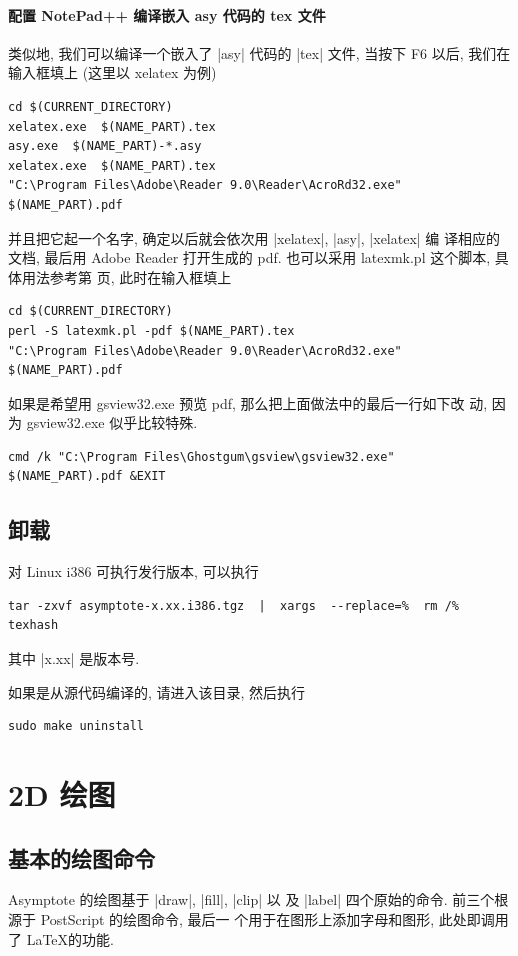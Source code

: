 \documentclass[nofonts,CJKnormalspaces]{ctexbook}[2009/05/20]
\begin{document}
\subsubsection{配置 NotePad++ 编译嵌入 asy 代码的 tex 文件}
类似地, 我们可以编译一个嵌入了 |asy| 代码的 |tex| 文件, 当按下 F6 以后,
我们在输入框填上 (这里以 xelatex 为例)
\begin{verbatim}
cd $(CURRENT_DIRECTORY)
xelatex.exe  $(NAME_PART).tex
asy.exe  $(NAME_PART)-*.asy
xelatex.exe  $(NAME_PART).tex
"C:\Program Files\Adobe\Reader 9.0\Reader\AcroRd32.exe" $(NAME_PART).pdf
\end{verbatim}
并且把它起一个名字, 确定以后就会依次用 |xelatex|, |asy|, |xelatex| 编
译相应的文档, 最后用 Adobe Reader 打开生成的 pdf.
也可以采用 latexmk.pl 这个脚本, 具体用法参考第 \pageref{asy:latexmk}
页, 此时在输入框填上
\begin{verbatim}
cd $(CURRENT_DIRECTORY)
perl -S latexmk.pl -pdf $(NAME_PART).tex
"C:\Program Files\Adobe\Reader 9.0\Reader\AcroRd32.exe" $(NAME_PART).pdf
\end{verbatim}

如果是希望用 gsview32.exe 预览 pdf, 那么把上面做法中的最后一行如下改
动, 因为 gsview32.exe 似乎比较特殊.
\begin{verbatim}
cmd /k "C:\Program Files\Ghostgum\gsview\gsview32.exe" $(NAME_PART).pdf &EXIT
\end{verbatim}

\section{卸载}
对 Linux i386 可执行发行版本, 可以执行
\begin{verbatim}
tar -zxvf asymptote-x.xx.i386.tgz  |  xargs  --replace=%  rm /%
texhash
\end{verbatim}
其中 |x.xx| 是版本号.

如果是从源代码编译的, 请进入该目录, 然后执行
\begin{verbatim}
sudo make uninstall
\end{verbatim}


\chapter{2D 绘图}

\section{基本的绘图命令}
Asymptote 的绘图基于 |draw|, |fill|, |clip| 以
及 |label| 四个原始的命令. 前三个根源于 PostScript 的绘图命令, 最后一
个用于在图形上添加字母和图形, 此处即调用了 \LaTeX 的功能.
\end{document}
